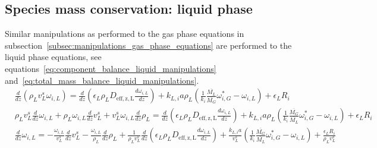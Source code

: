 \documentclass{article}
\begin{document}
\subsection{Species mass conservation: liquid phase}

Similar manipulations as performed to the gas phase equations in subsection~\ref{subsec:manipulations_gas_phase_equations} are performed to the liquid phase equations, see equations~\ref{eq:component_balance_liquid_manipulations} and~\ref{eq:total_mass_balance_liquid_manipulations}. 
\begin{equation}
	\begin{split}
	&\frac{d}{dz}\left(\rho_L v_L^s \omega_{i,L} \right) = \frac{d}{dz}\left(\epsilon_L \rho_L D_{\mathrm{eff,z,L}}\frac{d\omega_{i,L}}{dz} \right)+ k_{L,i}a\rho_L(\frac{1}{k_i}\frac{\overline{M_L}}{\overline{M_G}}\omega_{i,G}^*-\omega_{i,L}) + \epsilon_LR_i \\
	&\rho_Lv_L^s\frac{d}{dz}\omega_{i,L} + \rho_L\omega_{i,L} \frac{d}{dz}v_L^s + v_L^s \omega_{i,L} \frac{d}{dz}\rho_L =\frac{d}{dz}\left(\epsilon_L \rho_L D_{\mathrm{eff,z,L}}\frac{d\omega_{i,L}}{dz} \right)+ k_{L,i}a\rho_L(\frac{1}{k_i}\frac{\overline{M_G}}{\overline{M_L}}\omega_{i,G}^*-\omega_{i,L}) + \epsilon_LR_i\\
	&\frac{d}{dz}\omega_{i,L} = -\frac{\omega_{i,L}}{v_L^s} \frac{d}{dz}v_L^s - \frac{\omega_{i,L}}{\rho_L} \frac{d}{dz}\rho_L+ \frac{1}{\rho_Lv_L^s}\frac{d}{dz}\left(\epsilon_L \rho_L D_{\mathrm{eff,z,L}}\frac{d\omega_{i,L}}{dz} \right)+\frac{k_{L,i}a}{v_L^s}(\frac{1}{k_i}\frac{\overline{M_G}}{\overline{M_L}}\omega_{i,G}^*-\omega_{i,L}) + \frac{\epsilon_LR_i}{\rho_L v_L^s}
	\label{eq:component_balance_liquid_manipulations}
	\end{split}
\end{equation}
\end{document}
